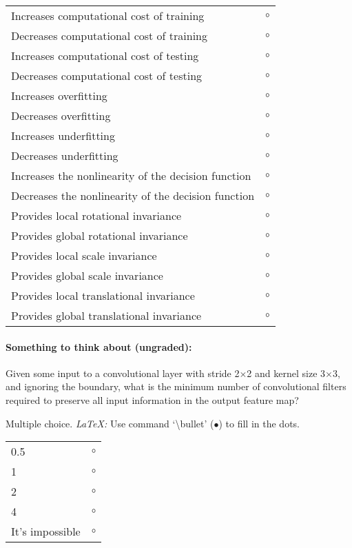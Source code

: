 \begin{tabular}[h]{lr}
\toprule
Increases computational cost of training & $\circ$ \\
Decreases computational cost of training & $\circ$ \\
Increases computational cost of testing & $\circ$ \\
Decreases computational cost of testing & $\circ$ \\
\midrule
Increases overfitting & $\circ$ \\
Decreases overfitting & $\circ$ \\
Increases underfitting & $\circ$ \\
Decreases underfitting & $\circ$ \\
\midrule
Increases the nonlinearity of the decision function & $\circ$ \\
Decreases the nonlinearity of the decision function & $\circ$ \\
\midrule
Provides local rotational invariance & $\circ$ \\
Provides global rotational invariance & $\circ$ \\
Provides local scale invariance & $\circ$ \\
Provides global scale invariance & $\circ$ \\
Provides local translational invariance & $\circ$ \\
Provides global translational invariance & $\circ$ \\
\bottomrule
\end{tabular}


\paragraph{Something to think about (ungraded):} Given some input to a convolutional layer with stride 2$\times$2 and kernel size 3$\times$3, and ignoring the boundary, what is the minimum number of convolutional filters required to preserve all input information in the output feature map?

Multiple choice. 
\emph{LaTeX:} Use command  `\textbackslash bullet' ($\bullet$) to fill in the dots.

\begin{tabular}[h]{lc}
\toprule
0.5 & $\circ$ \\
1 & $\circ$ \\
2 & $\circ$ \\
4 & $\circ$ \\
It's impossible & $\circ$ \\
\bottomrule
\end{tabular}


